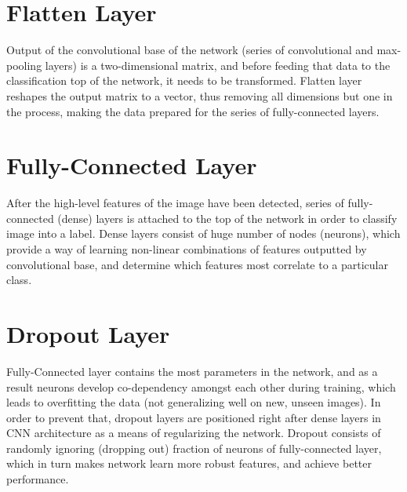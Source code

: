\section{Flatten Layer}

Output of the convolutional base of the network (series of convolutional and max-pooling layers) is a two-dimensional matrix, and before feeding that data to the classification top of the network, it needs to be transformed. Flatten layer reshapes the output matrix to a vector, thus removing all dimensions but one in the process, making the data prepared for the series of fully-connected layers.

\section{Fully-Connected Layer}

After the high-level features of the image have been detected, series of fully-connected (dense) layers is attached to the top of the network in order to classify image into a label. Dense layers consist of huge number of nodes (neurons), which provide a way of learning non-linear combinations of features outputted by convolutional base, and determine which features most correlate to a particular class.

\section{Dropout Layer}

Fully-Connected layer contains the most parameters in the network, and as a result neurons develop co-dependency amongst each other during training, which leads to overfitting the data (not generalizing well on new, unseen images). In order to prevent that, dropout layers are positioned right after dense layers in CNN architecture as a means of regularizing the network. Dropout consists of randomly ignoring (dropping out) fraction of neurons of fully-connected layer, which in turn makes network learn more robust features, and achieve better performance.
\clearpage
